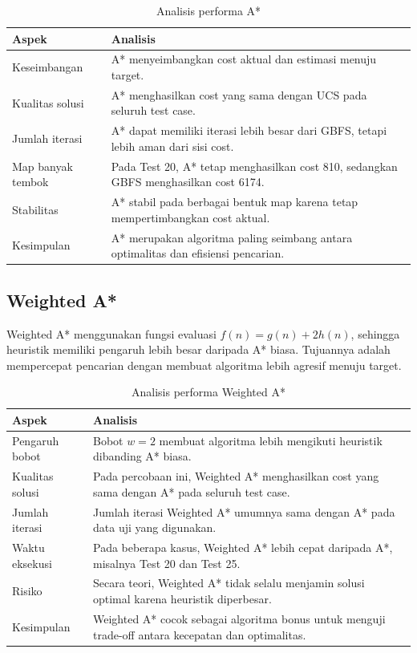 \begin{table}[H]
	\centering
	\caption{Analisis performa A*}
	\begin{tabular}{|p{4cm}|p{10cm}|}
		\hline
		\rowcolor{red!15}
		\textbf{Aspek} & \textbf{Analisis} \\
		\hline
		Keseimbangan & A* menyeimbangkan cost aktual dan estimasi menuju target. \\
		\hline
		Kualitas solusi & A* menghasilkan cost yang sama dengan UCS pada seluruh test case. \\
		\hline
		Jumlah iterasi & A* dapat memiliki iterasi lebih besar dari GBFS, tetapi lebih aman dari sisi cost. \\
		\hline
		Map banyak tembok & Pada Test 20, A* tetap menghasilkan cost 810, sedangkan GBFS menghasilkan cost 6174. \\
		\hline
		Stabilitas & A* stabil pada berbagai bentuk map karena tetap mempertimbangkan cost aktual. \\
		\hline
		Kesimpulan & A* merupakan algoritma paling seimbang antara optimalitas dan efisiensi pencarian. \\
		\hline
	\end{tabular}
\end{table}

\subsection{Weighted A*}

Weighted A* menggunakan fungsi evaluasi $f(n)=g(n)+2h(n)$, sehingga heuristik memiliki pengaruh lebih besar daripada A* biasa. 
Tujuannya adalah mempercepat pencarian dengan membuat algoritma lebih agresif menuju target.

\begin{table}[H]
	\centering
	\caption{Analisis performa Weighted A*}
	\begin{tabular}{|p{4cm}|p{10cm}|}
		\hline
		\rowcolor{purple!15}
		\textbf{Aspek} & \textbf{Analisis} \\
		\hline
		Pengaruh bobot & Bobot $w=2$ membuat algoritma lebih mengikuti heuristik dibanding A* biasa. \\
		\hline
		Kualitas solusi & Pada percobaan ini, Weighted A* menghasilkan cost yang sama dengan A* pada seluruh test case. \\
		\hline
		Jumlah iterasi & Jumlah iterasi Weighted A* umumnya sama dengan A* pada data uji yang digunakan. \\
		\hline
		Waktu eksekusi & Pada beberapa kasus, Weighted A* lebih cepat daripada A*, misalnya Test 20 dan Test 25. \\
		\hline
		Risiko & Secara teori, Weighted A* tidak selalu menjamin solusi optimal karena heuristik diperbesar. \\
		\hline
		Kesimpulan & Weighted A* cocok sebagai algoritma bonus untuk menguji trade-off antara kecepatan dan optimalitas. \\
		\hline
	\end{tabular}
\end{table}


